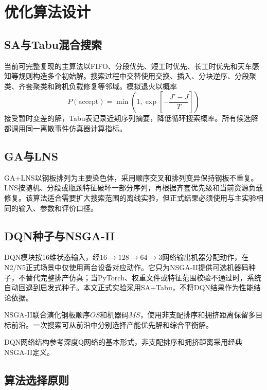 \documentclass[UTF8,zihao=-4,openany]{ctexrep}
\begin{document}
\chapter{优化算法设计}

\section{SA与Tabu混合搜索}

当前可完整复现的主算法以FIFO、分段优先、短工时优先、长工时优先和天车感知等规则构造多个初始解。搜索过程中交替使用交换、插入、分块逆序、分段聚类、齐套聚类和跨机负载修复等邻域。模拟退火以概率
\begin{equation}
 P(\text{accept})=\min\left(1,\exp\left[-\frac{J'-J}{T}\right]\right)
\end{equation}
接受暂时变差的解\cite{sa}，Tabu表记录近期序列摘要，降低循环搜索概率\cite{tabu}。所有候选解都调用同一离散事件仿真器计算指标。

\section{GA与LNS}

GA+LNS以钢板排列为主要染色体，采用顺序交叉和排列变异保持钢板不重复。LNS按随机、分段或瓶颈特征破坏一部分序列，再根据齐套优先级和当前资源负载修复。该算法适合需要扩大搜索范围的离线实验，但正式结果必须使用与主实验相同的输入、参数和评价口径。

\section{DQN种子与NSGA-II}

DQN模块按16维状态输入，经$16\rightarrow128\rightarrow64\rightarrow3$网络输出机器分配动作，在N2/N5正式场景中仅使用两台设备对应动作。它只为NSGA-II提供可选机器码种子，不替代完整排产仿真；当PyTorch、权重文件或特征范围校验不通过时，系统自动回退到启发式种子。本文正式实验采用SA+Tabu，不将DQN结果作为性能结论依据。

NSGA-II联合演化钢板顺序$OS$和机器码$MS$，使用非支配排序和拥挤距离保留多目标前沿。一次搜索可从前沿中分别选择产能优先解和综合平衡解。

DQN网络结构参考深度Q网络的基本形式\cite{dqn}，非支配排序和拥挤距离采用经典NSGA-II定义\cite{nsga2}。

\section{算法选择原则}
\end{document}

